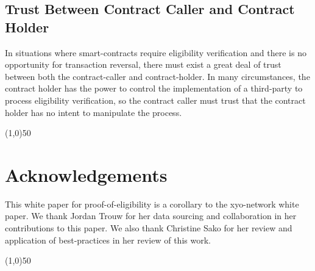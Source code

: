\documentclass{article}
\begin{document}
\subsection{Trust Between Contract Caller and Contract Holder}

In situations where \glspl{smart-contract} require eligibility verification and there is no opportunity for transaction reversal, there must exist a great deal of trust between both the \gls{contract-caller} and \gls{contract-holder}. In many circumstances, the contract holder has the power to control the implementation of a third-party to process eligibility verification, so the contract caller must trust that the contract holder has no intent to manipulate the process.

\begin{center}
\line(1,0){50}
\end{center}

\section {Acknowledgements}
This white paper for \Gls{proof-of-eligibility} is a corollary to the \Gls{xyo-network} white paper. We thank Jordan Trouw for her data sourcing and collaboration in her contributions to this paper. We also thank Christine Sako for her review and application of best-practices in her review of this work.


\begin{center}
\line(1,0){50}
\end{center}

\printglossaries
\end{document}
